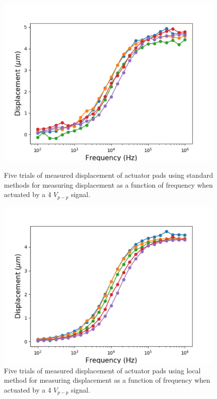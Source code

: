 \begin{figure}
    \centering
    \begin{minipage}{0.48\textwidth}
        \centering
        \includegraphics[width=1.1\textwidth]{Chapter2/Figs/Raster/disp_binary.png} %
        \caption{Five trials of measured displacement of actuator pads using standard methods for measuring displacement as a function of frequency when actuated by a 4 $V_{p-p}$ signal.}\label{binary_meas}
    \end{minipage}\hfill
    \begin{minipage}{0.48\textwidth}
        \centering
        \includegraphics[width=1.1\textwidth]{Chapter2/Figs/Raster/disp_adaptive.png} %
        \caption{Five trials of measured displacement of actuator pads using local method for measuring displacement as a function of frequency when actuated by a 4 $V_{p-p}$ signal.} \label{adaptive_meas}
    \end{minipage}
\end{figure}

